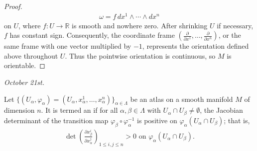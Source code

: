 \begin{proof}
    \begin{align}
        \omega = f\,dx^{1} \wedge \cdots \wedge dx^{n}
    \end{align}
    on $U$, where $f:U \to \mathbb{R}$ is smooth and nowhere zero. After shrinking $U$ if necessary, $f$ has constant sign. Consequently, the coordinate frame $(\frac{\partial}{\partial x^{1}},\ldots,\frac{\partial}{\partial x^{n}})$, or the same frame with one vector multiplied by $-1$, represents the orientation defined above throughout $U$. Thus the pointwise orientation is continuous, so $M$ is orientable.
\end{proof}

\textit{October 21st.}

\begin{definition}
    Let $\{(U_{\alpha},\varphi_{\alpha}) = (U_{\alpha},x^{1}_{\alpha},\ldots,x^{n}_{\alpha})\}_{\alpha \in \Lambda}$ be an atlas on a smooth manifold $M$ of dimension $n$. It is termed an  if for all $\alpha,\beta \in \Lambda$ with $U_{\alpha} \cap U_{\beta} \neq \emptyset$, the Jacobian determinant of the transition map $\varphi_{\beta} \circ \varphi_{\alpha}^{-1}$ is positive on $\varphi_{\alpha}(U_{\alpha} \cap U_{\beta})$; that is,
    \begin{align}
        \det\left( \frac{\partial x^{i}_{\beta}}{\partial x^{j}_{\alpha}} \right)_{1 \leq i,j \leq n} > 0 \text{ on } \varphi_{\alpha}(U_{\alpha} \cap U_{\beta}).
    \end{align}
\end{definition}

